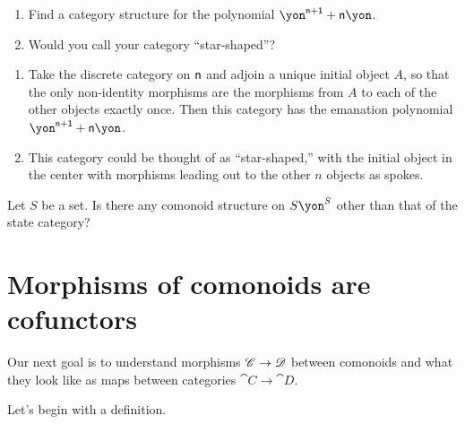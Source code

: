 \documentclass[Book-Poly]{subfiles}
\begin{document}
\begin{exercise}\label{ex.star_shaped}
\begin{enumerate}
	\item Find a category structure for the polynomial $\yon^{\ord{n}+\1}+\ord{n}\yon$.
	\item Would you call your category ``star-shaped''?
\qedhere
\end{enumerate}
\begin{solution}
\begin{enumerate}
    \item Take the discrete category on $\mathsf{n}$ and adjoin a unique initial object $A$, so that the only non-identity morphisms are the morphisms from $A$ to each of the other objects exactly once.
    Then this category has the emanation polynomial $\yon^{\ord{n}+\1} + \ord{n}\yon$.
    \item This category could be thought of as ``star-shaped,'' with the initial object in the center with morphisms leading out to the other $n$ objects as spokes.
\end{enumerate}
\end{solution}
\end{exercise}

\begin{exercise}
Let $S$ be a set. Is there any comonoid structure on $S\yon^S$ other than that of the state category?
\end{exercise}


\section{Morphisms of comonoids are cofunctors}

Our next goal is to understand morphisms $\mathscr{C}\to\mathscr{D}$ between comonoids and what they look like as maps between categories $\cat{C}\to\cat{D}$.


 
Let's begin with a definition.
\end{document}
